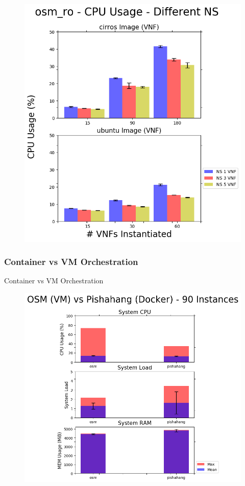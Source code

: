 \begin{figure}[h]
	\centering
	\includegraphics[width=0.7\linewidth]{figures/scalability_graphs/Docker-Grouped-Cases/osm/osm_ro-Mean-CPU-Cases}
	\caption{}
	\label{fig:osmro-mean-cpu-cases}
\end{figure}


\subsubsection{Container vs VM Orchestration} 

Container vs VM Orchestration

\begin{figure}[h]
	\centering
	\includegraphics[width=0.7\linewidth]{figures/scalability_graphs/Comparison-VM-Docker/System_metrics_comparison}
	\caption{}
	\label{fig:systemmetricscomparison}
\end{figure}

